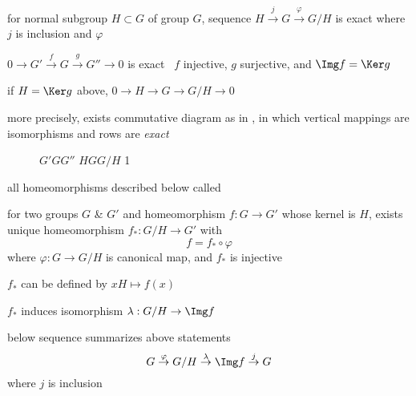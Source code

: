 \documentclass[17pt,landscape]{foils}
\begin{document}
{\bit
\vitem
	for normal subgroup $H\subset G$ of group $G$,
	sequence
	$
		H \overset{j}{\to}
		G \overset{\varphi}{\to}
		G/H
	$
	is exact
	where $j$ is inclusion and $\varphi$

\item
	$
		0 \overset{}{\to}
		G' \overset{f}{\to}
		G \overset{g}{\to}
		G'' \overset{}{\to}
		0
	$
	is exact
	\iaoi\
	$f$ injective, $g$ surjective, and $\Img f = \Ker g$

\item
if $H=\Ker g$ above,
	$
		0 \overset{}{\to}
		H \overset{}{\to}
		G \overset{}{\to}
		G/H \overset{}{\to}
		0
	$

\item
	more precisely, exists commutative diagram as in ,
	in which vertical mappings are isomorphisms and rows are \emph{exact}
	\begin{figure}
	\begin{center}
		\largecommutativediagram{6em}%
		{$G'$}{$G$}{$G''$}%
		{$H$}{$G$}{$G/H$}%
		{1}
			\label{fig:commutative diagram for canonical map}
	\end{center}
	\end{figure}
\eit



all homeomorphisms described below called 

\bit
\item
	for two groups $G$ \& $G'$ and homeomorphism $f:G\to G'$ whose kernel is $H$,
	exists unique homeomorphism $f_*: G/H \to G'$ with $$f=f_*\circ \varphi$$
	where $\varphi:G\to G/H$ is canonical map,
	and $f_*$ is injective
	\bit
	\item
		$f_*$ can be defined by $xH\mapsto f(x)$
	\item
	\item
		$f_*$ induces isomorphism $\lambda: G/H \to \Img f$
	\item
		below sequence summarizes above statements
		$$
			G \overset{\varphi}{\to}
			G/H \overset{\lambda}{\to}
			\Img f \overset{j}{\to}
			G
		$$
		where $j$ is inclusion
	\eit

}
\end{document}
